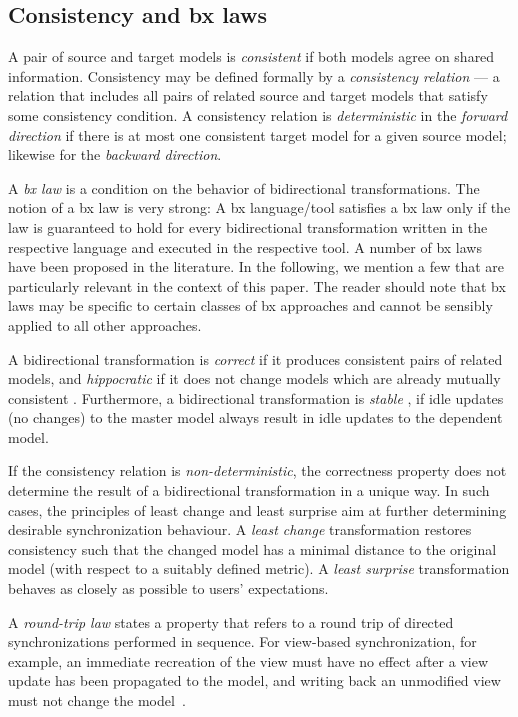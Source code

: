 \subsection{Consistency and bx laws}
\label{sec:Consistency}

A pair of source and target models is \emph{consistent} if both models agree on shared information. 
Consistency may be defined formally by a \emph{consistency relation} --- a relation that includes all pairs of related source and target models that satisfy some consistency condition. 
A consistency relation is \emph{deterministic} in the \emph{forward direction} if there is at most one consistent target model for a given source model; likewise for the \emph{backward direction}. 

A \emph{bx law} is a condition on the behavior of bidirectional transformations. 
The notion of a bx law is very strong: A bx language/tool satisfies a bx law only if the law is guaranteed to hold for every bidirectional transformation written in the respective language and executed in the respective tool. 
A number of bx laws have been proposed in the literature. 
In the following, we mention a few that are particularly relevant in the context of this paper. 
The reader should note that bx laws may be specific to certain classes of bx approaches and cannot be sensibly applied to all other approaches.

A bidirectional transformation is \emph{correct} if it produces consistent pairs of related models, and \emph{hippocratic} if it does not change models which are already mutually consistent \cite{SOSYM-Stevens2010}. Furthermore, a bidirectional transformation is \emph{stable} \cite{DBLP:journals/corr/PachecoMCV13}, if idle updates (no changes) to the master model always result in idle updates to the dependent model.
 
If the consistency relation is \emph{non-deter\-min\-is\-tic}, the correctness property does not determine the result of a bidirectional transformation in a unique way. 
In such cases, the principles of least change and least surprise aim at further determining desirable synchronization behaviour. 
A \emph{least change} transformation \cite{SOSYM-Macedo2016} restores consistency such that the changed model has a minimal distance to the original model (with respect to a suitably defined metric). 
A \emph{least surprise} transformation \cite{Cheney2015} behaves as closely as possible to users' expectations.

A \emph{round-trip law} states a property that refers to a round trip of directed synchronizations performed in sequence. 
For view-based synchronization, for example, an immediate recreation of the view must have no effect after a view update has been propagated to the model, and writing back an unmodified view must not change the model~\cite{TOPLAS2007-Foster}.


